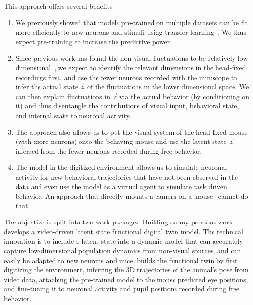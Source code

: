 \documentclass[B2,COG]{ercgrant}
\begin{document}
This approach offers several benefits
\begin{enumerate}[topsep=0pt,itemsep=0.62ex,partopsep=0ex,parsep=0.5ex]
    \item We previously showed that models pre-trained on multiple datasets can be fit more efficiently to new neurons and stimuli using transfer learning~\parencite{Lurz2020-ua}. We thus expect pre-training to increase the predictive power. 
    \item Since previous work has found the non-visual fluctuations to be relatively low dimensional~\parencite{Stringer2019-lt}, we expect to identify the relevant dimensions in the head-fixed recordings first, and use the fewer neurons recorded with the miniscope to infer the actual state $\vec{z}$ of the fluctuations in the lower dimensional space. We can then explain fluctuations in $\vec{z}$ via the actual behavior (by conditioning on it) and thus disentangle the contributions of visual input, behavioral state, and internal state to neuronal activity. 
    \item The approach also allows us to put the visual system of the head-fixed mouse (with more neurons) onto the behaving mouse and use the latent state $\vec{z}$ inferred from the fewer neurons recorded during free behavior. 
    \item The model in the digitized environment allows us to simulate neuronal activity for new behavioral trajectories that have not been observed in the data and even use the model as a virtual agent to simulate task driven behavior. An approach that directly mounts a camera on a mouse~\parencite{Parker2022-ac} cannot do that. 
\end{enumerate}


The objective is split into two work packages. 
Building on my previous work~\parencite{Sinz2018-sk, Bashiri2021-or},  develops a video-driven latent state functional digital twin model. 
The technical innovation is to include a latent state into a dynamic model that can accurately capture low-dimensional population dynamics from non-visual sources, and can easily be adapted to new neurons and mice. 
 builds the functional twin by first digitizing the environment, inferring the 3D trajectories of the animal's pose from video data, attaching the pre-trained model to the mouse predicted eye positions, and fine-tuning it to neuronal activity and pupil positions recorded during free behavior.


\end{document}
